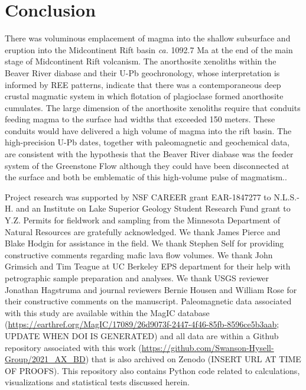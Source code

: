 \documentclass[draft]{agujournal2019}
\begin{document}
\section{Conclusion}

There was voluminous emplacement of magma into the shallow subsurface and eruption into the Midcontinent Rift basin \textit{ca.} 1092.7 Ma at the end of the main stage of Midcontinent Rift volcanism. The anorthosite xenoliths within the Beaver River diabase and their U-Pb geochronology, whose interpretation is informed by REE patterns, indicate that there was a contemporaneous deep crustal magmatic system in which flotation of plagioclase formed anorthosite cumulates. The large dimension of the anorthosite xenoliths require that conduits feeding magma to the surface had widths that exceeded 150 meters. These conduits would have delivered a high volume of magma into the rift basin. The high-precision U-Pb dates, together with paleomagnetic and geochemical data, are consistent with the hypothesis that the Beaver River diabase was the  feeder system of the Greenstone Flow although they could have been disconnected at the surface and both be emblematic of this high-volume pulse of magmatism..

\acknowledgments
Project research was supported by NSF CAREER grant EAR-1847277 to N.L.S.-H. and an Institute on Lake Superior Geology Student Research Fund grant to Y.Z. Permits for fieldwork and sampling from the Minnesota Department of Natural Resources are gratefully acknowledged. We thank James Pierce and Blake Hodgin for assistance in the field. We thank Stephen Self for providing constructive comments regarding mafic lava flow volumes. We thank John Grimsich and Tim Teague at UC Berkeley EPS department for their help with petrographic sample preparation and analyses. We thank USGS reviewer Jonathan Hagstruma and journal reviewers Bernie Housen and William Rose for their constructive comments on the manuscript. Paleomagnetic data associated with this study are available within the MagIC database (\url{https://earthref.org/MagIC/17089/26d9073f-2447-4f46-85fb-8596ce5b3aab}; UPDATE WHEN DOI IS GENERATED) and all data are within a Github repository associated with this work (\url{https://github.com/Swanson-Hysell-Group/2021_AX_BD}) that is also archived on Zenodo (INSERT URL AT TIME OF PROOFS). This repository also contains Python code related to calculations, visualizations and statistical tests discussed herein.  
\end{document}

